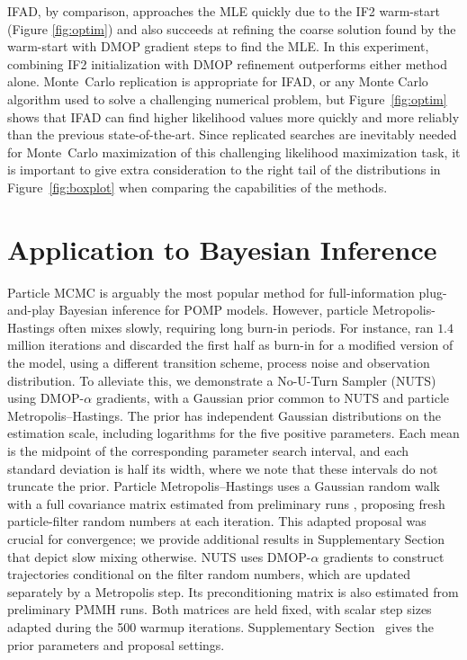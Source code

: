 \documentclass[numsec,webpdf,modern,medium,namedate]{oup-authoring-template}
\begin{document}
IFAD, by comparison, approaches the MLE quickly due to the IF2 warm-start (Figure \ref{fig:optim}) and also succeeds at refining the coarse solution found by the warm-start with DMOP gradient steps to find the MLE.
In this experiment, combining IF2 initialization with DMOP refinement outperforms either method alone.
Monte~Carlo replication is appropriate for IFAD, or any Monte Carlo algorithm used to solve a challenging numerical problem, but Figure~\ref{fig:optim} shows that IFAD can find higher likelihood values more quickly and more reliably than the previous state-of-the-art. 
Since replicated searches are inevitably needed for Monte~Carlo maximization of this challenging likelihood maximization task, it is important to give extra consideration to the right tail of the distributions in Figure~\ref{fig:boxplot} when comparing the capabilities of the methods. 


\section{Application to Bayesian Inference}
\label{sec:bayes}

Particle MCMC \citep{andrieu10} is arguably the most popular method for full-information plug-and-play Bayesian inference for POMP models.
However, particle Metropolis-Hastings often mixes slowly, requiring long burn-in periods.
For instance, \cite{fasiolo16} ran $1.4$ million iterations and discarded the first half as burn-in for a modified version of the \cite{king08} model, using a different transition scheme, process noise and observation distribution.
To alleviate this, we demonstrate a No-U-Turn Sampler (NUTS) \citep{hoffman14} using DMOP-$\alpha$ gradients, with a Gaussian prior common to NUTS and particle Metropolis--Hastings.
The prior has independent Gaussian distributions on the estimation scale, including logarithms for the five positive parameters. Each mean is the midpoint of the corresponding parameter search interval, and each standard deviation is half its width, where we note that these intervals do not truncate the prior. Particle Metropolis--Hastings uses a Gaussian random walk with a full covariance matrix estimated from preliminary runs \citep[p.~29]{dahlin19}, proposing fresh particle-filter random numbers at each iteration. This adapted proposal was crucial for convergence; we provide additional results in Supplementary Section~{\suppSecBayesFigs} that depict slow mixing otherwise. NUTS uses DMOP-$\alpha$ gradients to construct trajectories conditional on the filter random numbers, which are updated separately by a Metropolis step. Its preconditioning matrix is also estimated from preliminary PMMH runs. Both matrices are held fixed, with scalar step sizes adapted during the 500 warmup iterations.  Supplementary Section~{\suppSecBayesFigs} gives the prior parameters and proposal settings.
\end{document}
